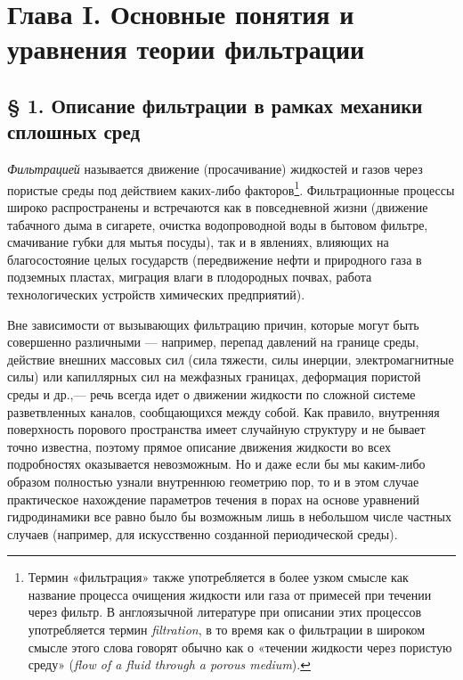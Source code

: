 \section*{Глава I. Основные понятия и уравнения теории фильтрации}
\label{q1:chapter-i}
\subsection*{§ 1. Описание фильтрации в рамках механики сплошных сред}
\label{q1:section-1}
\setcounter{footnote}{0}
\textit{Фильтрацией} называется движение (просачивание) жидкостей и газов через пористые среды под действием каких-либо факторов\footnote{Термин «фильтрация» также употребляется в более узком смысле как название процесса очищения жидкости или газа от примесей при течении через фильтр. В англоязычной литературе при описании этих процессов употребляется термин \textit{filtration}, в то время как о фильтрации в широком смысле этого слова говорят обычно как о «течении жидкости через пористую среду» (\textit{flow of a fluid through a porous medium}).}. Фильтрационные процессы широко распространены и встречаются как в повседневной жизни (движение табачного дыма в сигарете, очистка водопроводной воды в бытовом фильтре, смачивание губки для мытья посуды), так и в явлениях, влияющих на благосостояние целых государств (передвижение нефти и природного газа в подземных пластах, миграция влаги в плодородных почвах, работа технологических устройств химических предприятий).

Вне зависимости от вызывающих фильтрацию причин, которые могут быть совершенно различными --- например, перепад давлений на границе среды, действие внешних массовых сил (сила тяжести, силы инерции, электромагнитные силы) или капиллярных сил на межфазных границах, деформация пористой среды и др.,--- речь всегда идет о движении жидкости по сложной системе разветвленных каналов, сообщающихся между собой. Как правило, внутренняя поверхность порового пространства имеет случайную структуру и не бывает точно известна, поэтому прямое описание движения жидкости во всех подробностях оказывается невозможным. Но и даже если бы мы каким-либо образом полностью узнали внутреннюю геометрию пор, то и в этом случае практическое нахождение параметров течения в порах на основе уравнений гидродинамики все равно было бы возможным лишь в небольшом числе частных случаев (например, для искусственно созданной периодической среды).

